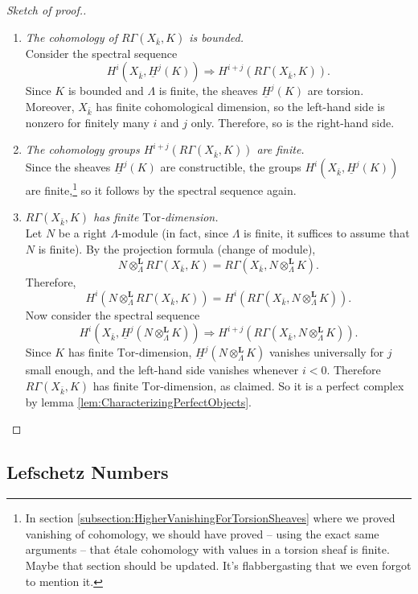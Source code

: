 \begin{proof}[Sketch of proof.] $ $
\begin{enumerate}
\item
{\it The cohomology of $R\Gamma(X_{\bar k}, K)$ is bounded.}
\\
Consider the spectral sequence
$$
H^i(X_{\bar k}, \underline H^j(K)) \Rightarrow H^{i+j} (R\Gamma(X_{\bar k}, K)).
$$
Since $K$ is bounded and $\Lambda$ is finite, the sheaves $\underline H^j(K)$ are torsion. Moreover, $X_{\bar k}$ has finite cohomological dimension, so the left-hand side is nonzero for finitely many $i$ and $j$ only. Therefore, so is the right-hand side.
\item
{\it The cohomology groups $H^{i+j} (R\Gamma(X_{\bar k}, K))$ are finite.}
\\
Since the sheaves $\underline H^j(K)$ are constructible, the groups $H^i(X_{\bar k}, \underline H^j(K))$ are finite,\footnote{In section \ref{subsection:HigherVanishingForTorsionSheaves} where we proved vanishing of cohomology, we should have proved -- using the exact same arguments -- that \'etale cohomology with values in a torsion sheaf is finite. Maybe that section should be updated. It's flabbergasting that we even forgot to mention it.} so it follows by the spectral sequence again. 
\item
{\it $R\Gamma(X_{\bar k}, K)$ has finite $\text{Tor}$-dimension.}
\\
Let $N$ be a right $\Lambda$-module (in fact, since $\Lambda$ is finite, it suffices to assume that $N$ is finite). By the projection formula (change of module), 
$$
N\otimes^\mathbf{L}_\Lambda R \Gamma(X_{\bar k}, K) = R\Gamma(X_{\bar k}, N\otimes^\mathbf{L}_\Lambda K).
$$
Therefore,
$$
H^i (N\otimes^\mathbf{L}_\Lambda R\Gamma(X_{\bar k}, K)) = H^i(R\Gamma(X_{\bar k}, N \otimes_{\Lambda}^\mathbf{L} K)).
$$
Now consider the spectral sequence
$$
H^i (X_{\bar k}, \underline H^j (N\otimes_{\Lambda}^\mathbf{L} K))
\Rightarrow
H^{i+j}(R\Gamma(X_{\bar k}, N \otimes_{\Lambda}^\mathbf{L} K)).
$$
Since $K$ has finite $\text{Tor}$-dimension, $\underline H^j (N\otimes_{\Lambda}^\mathbf{L} K)$ vanishes universally for $j$ small enough, and the left-hand side vanishes whenever $i < 0$. Therefore $R\Gamma(X_{\bar k}, K)$ has finite $\text{Tor}$-dimension, as claimed. So it is a perfect complex by lemma \ref{lem:CharacterizingPerfectObjects}.
\end{enumerate}
\end{proof}

\subsection{Lefschetz Numbers}

